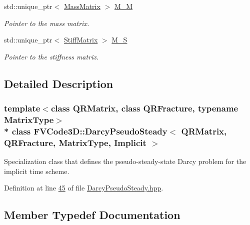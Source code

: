 \begin{DoxyCompactItemize}
std\+::unique\+\_\+ptr$<$ \hyperlink{classFVCode3D_1_1MassMatrix}{Mass\+Matrix} $>$ \hyperlink{classFVCode3D_1_1DarcyPseudoSteady_3_01QRMatrix_00_01QRFracture_00_01MatrixType_00_01Implicit_01_4_a7105356f402824767287690e83c0977d}{M\+\_\+M}
\begin{DoxyCompactList}\small\item\em Pointer to the mass matrix. \end{DoxyCompactList}\item 
std\+::unique\+\_\+ptr$<$ \hyperlink{classFVCode3D_1_1StiffMatrix}{Stiff\+Matrix} $>$ \hyperlink{classFVCode3D_1_1DarcyPseudoSteady_3_01QRMatrix_00_01QRFracture_00_01MatrixType_00_01Implicit_01_4_a2ec0b47ef1237ba7abfaa11857d656c7}{M\+\_\+S}
\begin{DoxyCompactList}\small\item\em Pointer to the stiffness matrix. \end{DoxyCompactList}\end{DoxyCompactItemize}


\subsection{Detailed Description}
\subsubsection*{template$<$class Q\+R\+Matrix, class Q\+R\+Fracture, typename Matrix\+Type$>$\\*
class F\+V\+Code3\+D\+::\+Darcy\+Pseudo\+Steady$<$ Q\+R\+Matrix, Q\+R\+Fracture, Matrix\+Type, Implicit $>$}

Specialization class that defines the pseudo-\/steady-\/state Darcy problem for the implicit time scheme. 

Definition at line \hyperlink{DarcyPseudoSteady_8hpp_source_l00045}{45} of file \hyperlink{DarcyPseudoSteady_8hpp_source}{Darcy\+Pseudo\+Steady.\+hpp}.



\subsection{Member Typedef Documentation}
